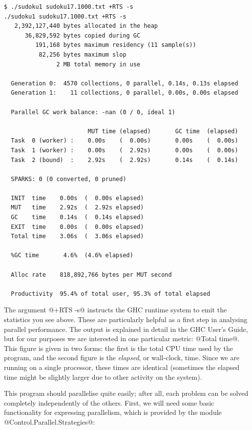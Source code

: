 {\small \begin{verbatim}
$ ./sudoku1 sudoku17.1000.txt +RTS -s
./sudoku1 sudoku17.1000.txt +RTS -s 
   2,392,127,440 bytes allocated in the heap
      36,829,592 bytes copied during GC
         191,168 bytes maximum residency (11 sample(s))
          82,256 bytes maximum slop
               2 MB total memory in use

  Generation 0:  4570 collections, 0 parallel, 0.14s, 0.13s elapsed
  Generation 1:    11 collections, 0 parallel, 0.00s, 0.00s elapsed

  Parallel GC work balance: -nan (0 / 0, ideal 1)

                        MUT time (elapsed)       GC time  (elapsed)
  Task  0 (worker) :    0.00s    (  0.00s)       0.00s    (  0.00s)
  Task  1 (worker) :    0.00s    (  2.92s)       0.00s    (  0.00s)
  Task  2 (bound)  :    2.92s    (  2.92s)       0.14s    (  0.14s)

  SPARKS: 0 (0 converted, 0 pruned)

  INIT  time    0.00s  (  0.00s elapsed)
  MUT   time    2.92s  (  2.92s elapsed)
  GC    time    0.14s  (  0.14s elapsed)
  EXIT  time    0.00s  (  0.00s elapsed)
  Total time    3.06s  (  3.06s elapsed)

  %GC time       4.6%  (4.6% elapsed)

  Alloc rate    818,892,766 bytes per MUT second

  Productivity  95.4% of total user, 95.3% of total elapsed
\end{verbatim}}

\noindent The argument @+RTS -s@ instructs the GHC runtime system to
emit the statistics you see above. These are particularly helpful as a
first step in analysing parallel performance.  The output is explained
in detail in the GHC User's Guide, but for our purposes we are
interested in one particular metric: @Total time@.  This figure is
given in two forms: the first is the total CPU time used by the
program, and the second figure is the \emph{elapsed}, or wall-clock,
time.  Since we are running on a single processor, these times are
identical (sometimes the elapsed time might be slightly larger due to
other activity on the system).

This program should parallelise quite easily; after all, each problem
can be solved completely independently of the others.  First, we
will need some basic functionality for expressing parallelism, which
is provided by the module @Control.Parallel.Strategies@:

